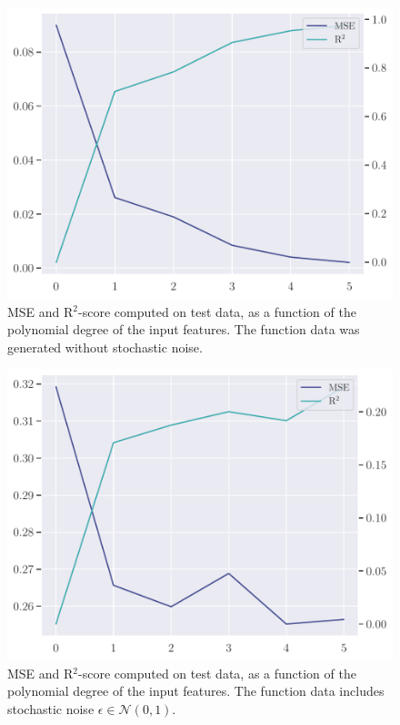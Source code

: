 \begin{figure}
    \centering
    \includegraphics[width=0.9\linewidth]{project-1/latex/figures/ols_error.pdf}
    \caption{MSE and R$^{2}$-score computed on test data, as a function of the polynomial degree of the input features. The function data was generated without stochastic noise.}
    \label{fig:ols_error}
\end{figure}

\begin{figure}
    \centering
    \includegraphics[width=0.9\linewidth]{project-1/latex/figures/ols_error_noisy.pdf}
    \caption{MSE and R$^{2}$-score computed on test data, as a function of the polynomial degree of the input features. The function data includes stochastic noise $\epsilon \in \mathcal{N}(0, 1)$.}
    \label{fig:ols_error_noisy}
\end{figure}

